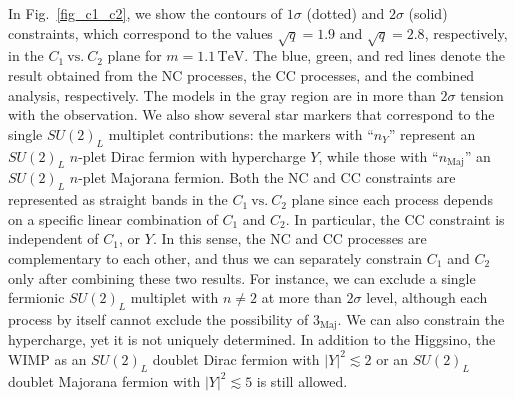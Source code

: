 \documentclass[12pt,twoside,book]{article}
\begin{document}
In Fig.~\ref{fig_c1_c2}, we show the contours of $1\sigma$ (dotted) and $2\sigma$ (solid) constraints, which correspond to the values $\sqrt{q}=1.9$ and $\sqrt{q}=2.8$, respectively, in the $C_1~\mathrm{vs.}~C_2$ plane for $m=1.1\,\mathrm{TeV}$.
The blue, green, and red lines denote the result obtained from the NC processes, the CC processes, and the combined analysis, respectively.
The models in the gray region are in more than $2\sigma$ tension with the observation.
We also show several star markers that correspond to the single $SU(2)_L$ multiplet contributions: the markers with ``$n_Y$'' represent an $SU(2)_L$ $n$-plet Dirac fermion with hypercharge $Y$, while those with ``$n_\mathrm{Maj}$'' an $SU(2)_L$ $n$-plet Majorana fermion.
Both the NC and CC constraints are represented as straight bands in the $C_1~\mathrm{vs.}~C_2$ plane since each process depends on a specific linear combination of $C_1$ and $C_2$.
In particular, the CC constraint is independent of $C_1$, or $Y$.
In this sense, the NC and CC processes are complementary to each other, and thus we can separately constrain $C_1$ and $C_2$ only after combining these two results.
For instance, we can exclude a single fermionic $SU(2)_L$ multiplet with $n \neq 2$ at more than $2\sigma$ level, although each process by itself cannot exclude the possibility of $3_{\text{Maj}}$.
We can also constrain the hypercharge, yet it is not uniquely determined.
In addition to the Higgsino, the WIMP as an $SU(2)_L$ doublet Dirac fermion with $|Y|^2\lesssim 2$ or an $SU(2)_L$ doublet Majorana fermion with $|Y|^2\lesssim 5$ is still allowed.
\end{document}
